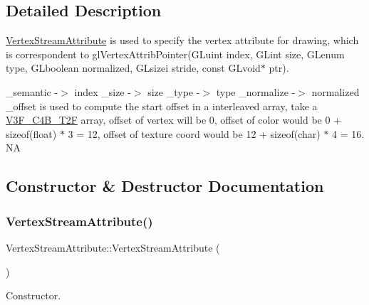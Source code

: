\subsection{Detailed Description}
\hyperlink{structVertexStreamAttribute}{Vertex\+Stream\+Attribute} is used to specify the vertex attribute for drawing, which is correspondent to gl\+Vertex\+Attrib\+Pointer(\+G\+Luint index, G\+Lint size, G\+Lenum type, G\+Lboolean normalized, G\+Lsizei stride, const G\+Lvoid$\ast$ ptr).

\+\_\+semantic -\/$>$ index \+\_\+size -\/$>$ size \+\_\+type -\/$>$ type \+\_\+normalize -\/$>$ normalized \+\_\+offset is used to compute the start offset in a interleaved array, take a \hyperlink{structV3F__C4B__T2F}{V3\+F\+\_\+\+C4\+B\+\_\+\+T2F} array, offset of vertex will be 0, offset of color would be 0 + sizeof(float) $\ast$ 3 = 12, offset of texture coord would be 12 + sizeof(char) $\ast$ 4 = 16.  NA 

\subsection{Constructor \& Destructor Documentation}
\mbox{\label{structVertexStreamAttribute_a37721a26567e79bdea1c2f9f0f33c663}} 
\subsubsection{\texorpdfstring{Vertex\+Stream\+Attribute()}{VertexStreamAttribute()}\hspace{0.1cm}{\footnotesize\ttfamily [1/6]}}
{\footnotesize\ttfamily Vertex\+Stream\+Attribute\+::\+Vertex\+Stream\+Attribute (\begin{DoxyParamCaption}{ }\end{DoxyParamCaption})\hspace{0.3cm}{\ttfamily [inline]}}

Constructor. \mbox{\label{structVertexStreamAttribute_a563072570593c77863c79af39f198bc3}} 
